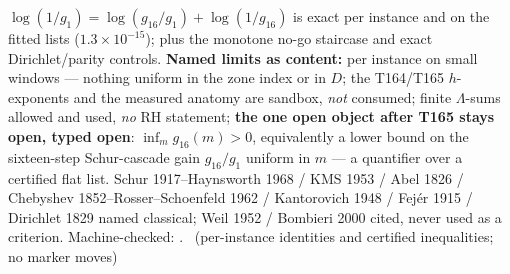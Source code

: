 \documentclass[11pt,a4paper]{article}
\theoremstyle{definition}
\begin{document}
$\log(1/g_1)=\log(g_{16}/g_1)+\log(1/g_{16})$ is exact per instance and
on the fitted lists ($1.3\times10^{-15}$); plus the monotone no-go
staircase and exact Dirichlet/parity controls.
\textbf{Named limits as content:} per instance on small windows ---
nothing uniform in the zone index or in $D$; the T164/T165 $h$-exponents
and the measured anatomy are sandbox, \emph{not} consumed; finite
$\Lambda$-sums allowed and used, \emph{no} RH statement; \textbf{the one
open object after T165 stays open, typed open}: $\inf_m g_{16}(m)>0$,
equivalently a lower bound on the sixteen-step Schur-cascade gain
$g_{16}/g_1$ uniform in $m$ --- a quantifier over a certified flat list.
Schur 1917--Haynsworth 1968 / KMS 1953 / Abel 1826 / Chebyshev
1852--Rosser--Schoenfeld 1962 / Kantorovich 1948 / Fej\'er 1915 /
Dirichlet 1829 named classical; Weil 1952 / Bombieri 2000 cited, never
used as a criterion.
Machine-checked:
.
\mE\ (per-instance identities and certified inequalities; no marker moves)
\end{document}
